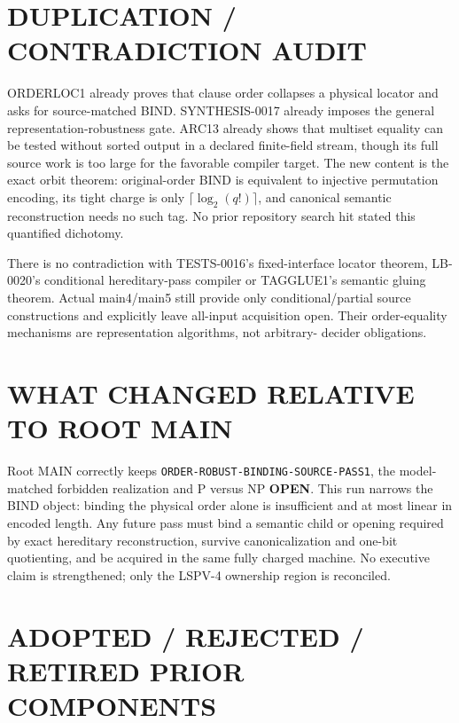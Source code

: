 \documentclass[11pt]{article}
\newcommand{\OPEN}{\textbf{OPEN}}
\begin{document}
\section{DUPLICATION / CONTRADICTION AUDIT}

ORDERLOC1 already proves that clause order collapses a physical locator and
asks for source-matched BIND.  SYNTHESIS-0017 already imposes the general
representation-robustness gate.  ARC13 already shows that multiset equality
can be tested without sorted output in a declared finite-field stream, though
its full source work is too large for the favorable compiler target.  The
new content is the exact orbit theorem: original-order BIND is equivalent to
injective permutation encoding, its tight charge is only
$\lceil\log_2(q!)\rceil$, and canonical semantic reconstruction needs no such
tag.  No prior repository search hit stated this quantified dichotomy.

There is no contradiction with TESTS-0016's fixed-interface locator theorem,
LB-0020's conditional hereditary-pass compiler or TAGGLUE1's semantic gluing
theorem.  Actual main4/main5 still provide only conditional/partial source
constructions and explicitly leave all-input acquisition open.  Their
order-equality mechanisms are representation algorithms, not arbitrary-
decider obligations.

\section{WHAT CHANGED RELATIVE TO ROOT MAIN}

Root MAIN correctly keeps \texttt{ORDER-ROBUST-BINDING-SOURCE-PASS1}, the
model-matched forbidden realization and P versus NP \OPEN.  This run narrows
the BIND object: binding the physical order alone is insufficient and at most
linear in encoded length.  Any future pass must bind a semantic child or
opening required by exact hereditary reconstruction, survive canonicalization
and one-bit quotienting, and be acquired in the same fully charged machine.
No executive claim is strengthened; only the LSPV-4 ownership region is
reconciled.

\section{ADOPTED / REJECTED / RETIRED PRIOR COMPONENTS}
\end{document}
